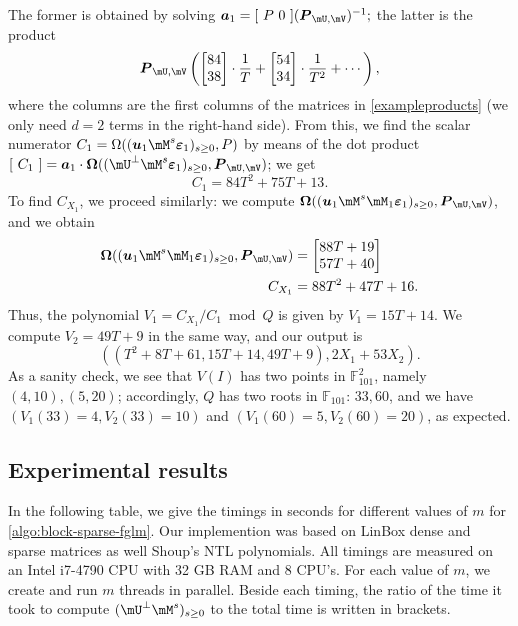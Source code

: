\documentclass[12pt]{article}
\newcommand{\mat}[1]{\bm{\MakeUppercase{#1}}} %
\newcommand{\row}[1]{\bm{\MakeLowercase{#1}}} %
\newcommand{\col}[1]{\bm{\MakeLowercase{#1}}} %
\newcommand{\minpoly}{P}
\newcommand{\sqfree}{Q}
\def\F {\ensuremath{\mathbb{F}}}
\begin{document}
The former is obtained by solving $\row{a}_1 = [~P~0~] (\mat{P}_{\mU,\mV})^{-1};$
the latter is the product
$$\mat{P}_{\mU,\mV} 
\left (
\begin{bmatrix}
84\\  
38
\end{bmatrix}\cdot \frac 1T+
\begin{bmatrix}
54\\  
34
\end{bmatrix}\cdot \frac 1{T^2}+
 \cdots \right),$$ where the columns are the first columns of the
 matrices in \cref{exampleproducts} (we only need $d=2$
 terms in the right-hand side).  From this, we find the scalar
 numerator $C_1 = \Omega((\row{u}_1 \mM^s\col{\varepsilon}_1)_{s \ge
   0}, \minpoly)$ by means of the dot product $[~C_1~] = \row{a}_1\cdot
 \mat{\Omega}( (\mU^\perp \mM^s\col{\varepsilon}_1)_{s \ge 0},
 \mat{P}_{\mU,\mV})$; we get
$$ C_1 = 84T^2 + 75T + 13.$$
To find $C_{X_1}$, we proceed similarly: we compute  $\mat{\Omega}( (\row{u}_1 \mM^s \mM_1\col{\varepsilon}_1)_{s \ge 0}, \mat{P}_{\mU,\mV})$,
and we obtain
\begin{align*}
\mat{\Omega}( (\row{u}_1 \mM^s \mM_1\col{\varepsilon}_1)_{s \ge 0}, \mat{P}_{\mU,\mV}) &=
\left [\begin{matrix} 88T + 19 \\ 57T+40
  \end{matrix} \right  ]\\
C_{X_1} &= 88T^2 + 47T  + 16.
\end{align*}
Thus, the polynomial $V_1 = C_{X_1}/C_1 \bmod \sqfree$ is 
given by $V_1= 15T+14$. 
We compute $V_2= 49T+9$ in the same way,
and our output is 
$$((T^2+8T+61, 15T+14, 49T+9), 2X_1 + 53 X_2).$$ 
As a sanity check, we see that
$V(I)$ has two points in $\F_{101}^2$, namely $(4,10),(5,20)$;
accordingly, $Q$ has two roots
in $\F_{101}$: $33,60$, and we have $(V_1(33) = 4, V_2(33) = 10)$
and $(V_1(60) = 5, V_2(60) = 20)$, as
expected.


\subsection{Experimental results}\label{section:ex}

In the following table, we give the timings in seconds for different
values of $m$ for \cref{algo:block-sparse-fglm}.  Our
implemention was based on LinBox \cite{LinBox} dense and sparse
matrices as well Shoup's NTL \cite{NTL} polynomials. All timings are
measured on an Intel i7-4790 CPU with 32 GB RAM and 8 CPU's. For each
value of $m$, we create and run $m$ threads in parallel. Beside each
timing, the ratio of the time it took to compute $(\mU^{\perp}
\mM^s)_{s\ge0}$ to the total time is written in brackets.
\end{document}
